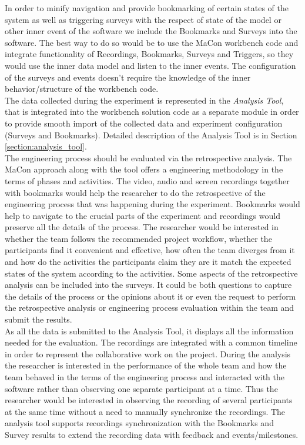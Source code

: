 In order to minify navigation and provide bookmarking of certain states of the system as well as triggering surveys with the respect of state of the model or other inner event of the software we include the Bookmarks and Surveys into the software. The best way to do so would be to use the MaCon workbench code and integrate functionality of Recordings, Bookmarks, Surveys and Triggers, so they would use the inner data model and listen to the inner events. The configuration of the surveys and events doesn't require the knowledge of the inner behavior/structure of the workbench code. \\

The data collected during the experiment is represented in the \textit{Analysis Tool}, that is integrated into the workbench solution code as a separate module in order to provide smooth import of the collected data and experiment configuration (Surveys and Bookmarks). Detailed description of the Analysis Tool is in Section \ref{section:analysis_tool}.\\

The engineering process should be evaluated via the retrospective analysis. The MaCon approach along with the tool offers a engineering methodology in the terms of phases and activities. The video, audio and screen recordings together with bookmarks would help the researcher to do the retrospective of the engineering process that was happening during the experiment. Bookmarks would help to navigate to the crucial parts of the experiment and recordings would preserve all the details of the process. The researcher would be interested in whether the team follows the recommended project workflow, whether the participants find it convenient and effective, how often the team diverges from it and how do the activities the participants claim they are it match the expected states of the system according to the activities. Some aspects of the retrospective analysis can be included into the surveys. It could be both questions to capture the details of the process or the opinions about it or even the request to perform the retrospective analysis or engineering process evaluation within the team and submit the results.\\ 

As all the data is submitted to the Analysis Tool, it displays all the information needed for the  evaluation. The recordings are integrated  with a common timeline in order to represent the collaborative work on the project. During the analysis the researcher is interested in the performance of the whole team and how the team behaved in the terms of the engineering process and interacted with the software rather than observing one separate participant at a time. Thus the researcher would be interested in observing the recording of several participants at the same time without a need to manually synchronize the recordings. The analysis tool supports recordings synchronization with the Bookmarks and Survey results to extend the recording data with feedback and events/milestones.\\

